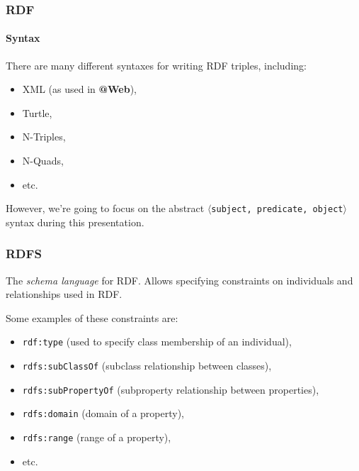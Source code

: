 \documentclass{beamer}
\makeatletter
\newcommand{\atweb}{\textbf{@Web}\xspace}
\newcommand{\triple}[1]{$\langle$\texttt{#1}$\rangle$}
\makeatother
\begin{document}
\begin{frame}
  \frametitle{RDF}
  \framesubtitle{Syntax}

  There are many different syntaxes for writing RDF triples, including:

  \pause

  \begin{itemize}
    \item XML (as used in \atweb),

    \pause

    \item Turtle,
    \item N-Triples,
    \item N-Quads,
    \item etc.
  \end{itemize}

  \pause

  However, we're going to focus on the abstract \triple{subject, predicate,
  object} syntax during this presentation.
\end{frame}

\begin{frame}
  \frametitle{RDFS}

  The \textit{schema language} for RDF. Allows specifying constraints on
  individuals and relationships used in RDF.

  \pause

  \medskip

  Some examples of these constraints are:

  \pause

  \begin{itemize}
    \item \texttt{rdf:type} (used to specify class membership of an individual),
    \item \texttt{rdfs:subClassOf} (subclass relationship between classes),
    \item \texttt{rdfs:subPropertyOf} (subproperty relationship between
      properties),
    \item \texttt{rdfs:domain} (domain of a property),
    \item \texttt{rdfs:range} (range of a property),
    \item etc.
  \end{itemize}
\end{frame}
\end{document}
